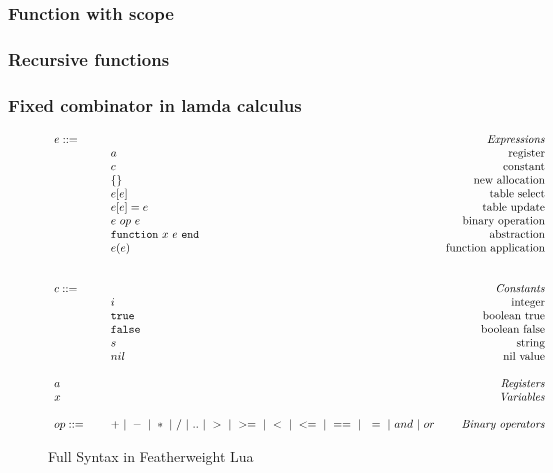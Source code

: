 \documentclass{article}
\begin{document}
\subsubsection{Function with scope}
\subsubsection{Recursive functions}
\subsubsection{Fixed combinator in lamda calculus}


\newcommand{\abFunction}[2]{{\tt function} ~{#1}~{#2}~{\tt end}}
\begin{figure}
\caption{Full Syntax in Featherweight Lua}
\label{fig:FW2Syx}
\[
  \begin{array}{llr}
  \mydefhead{e ::=\qquad\qquad\qquad\qquad}{Expressions}
  \mydefcase{a}{register}
  \mydefcase{c}{constant}
  \mydefcase{\{\}}{new allocation}
  \mydefcase{e[e]}{table select}
  \mydefcase{e[e] = e}{table update}
  \mydefcase{e ~op~ e}{binary operation}
  \mydefcase{\abFunction x e}{abstraction}
  \mydefcase{e(e)}{function application}
  \\
  \\
  \mydefhead{c ::=\qquad\qquad\qquad\qquad}{Constants}
  \mydefcase{i}{integer}
  \mydefcase{\tt true}{boolean true}
  \mydefcase{\tt false}{boolean false}
  \mydefcase{s}{string}
  \mydefcase{nil}{nil value}
  \\
  \mydefhead{a \qquad\qquad\qquad\qquad}{Registers}
  \mydefhead{x \qquad\qquad\qquad\qquad}{Variables}
  \\
  op ::= & + ~|~ - ~|~ * ~|~ / ~|~ .. ~|~ > ~|~ >= ~|~ < ~|~ <= ~|~ == ~|~ ~= ~|~ and ~|~ or & \mbox{\emph{Binary operators}} \\
\end{array}
\]
\end{figure}

\newcommand{\semanticFullRaw}[4]{{#1},{#2} \Downarrow {#3},{#4}}
\newcommand{\semanticFull}[4]{{#1},{#2} \Downarrow {#3}, {#4}}
\end{document}
